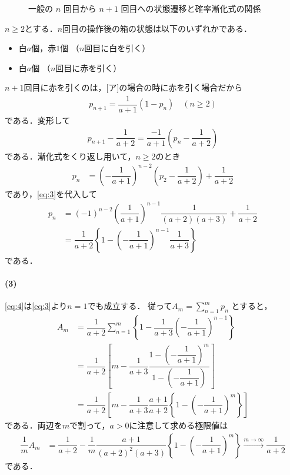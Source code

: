 \documentclass[../../main.tex]{subfiles}
\begin{document}
\begin{figure}[htb]
  \caption{一般の $n$ 回目から $n+1$ 回目への状態遷移と確率漸化式の関係}
  \label{fig:general_step_markov_transition}
\end{figure}

$n \ge 2$とする．$n$回目の操作後の箱の状態は以下のいずれかである．
\begin{itemize}
  \item[ア] 白$a$個，赤$1$個 （$n$回目に白を引く）
  \item[イ] 白$a$個 （$n$回目に赤を引く）
\end{itemize}

$n+1$回目に赤を引くのは，[ア]の場合の時に赤を引く場合だから
\begin{align}
  p_{n+1} = \dfrac{1}{a+1} (1-p_n) \quad (n \ge 2)
\end{align}
である．変形して
\begin{align}
  p_{n+1} - \dfrac{1}{a+2} = \dfrac{-1}{a+1} \left( p_n - \dfrac{1}{a+2} \right)
\end{align}
である．漸化式をくり返し用いて，$n \ge 2$のとき
\begin{align}
  p_n
  &= \left(-\dfrac{1}{a+1}\right)^{n-2} \left( p_2 - \dfrac{1}{a+2} \right) + \dfrac{1}{a+2}
\end{align}
であり，\cref{eq:3}を代入して
\begin{align}
  p_n
  &= (-1)^{n-2} \left( \dfrac{1}{a+1} \right)^{n-1} \dfrac{1}{(a+2)(a+3)} + \dfrac{1}{a+2} \\
  &= \dfrac{1}{a+2} \left\{ 1 - \left(-\dfrac{1}{a+1}\right)^{n-1} \dfrac{1}{a+3} \right\} \label{eq:4}
\end{align}
である．

\paragraph{(3)}

\cref{eq:4}は\cref{eq:3}より$n=1$でも成立する．
従って$A_m = \sum_{n=1}^m p_n$ とすると，
\begin{align}
  A_m
  &= \dfrac{1}{a+2}\sum_{n=1}^m \left\{ 1 - \dfrac{1}{a+3} \left(-\dfrac{1}{a+1}\right)^{n-1} \right\} \\
  &= \dfrac{1}{a+2}\left[m - \dfrac{1}{a+3} \dfrac{1 - \left(-\dfrac{1}{a+1}\right)^m}{1 - \left(-\dfrac{1}{a+1}\right)}\right] \\
  &= \dfrac{1}{a+2}\left[m - \dfrac{1}{a+3} \dfrac{a+1}{a+2} \left\{ 1 - \left(-\dfrac{1}{a+1}\right)^m \right\}\right]
\end{align}
である．両辺を$m$で割って，$a>0$に注意して求める極限値は
\begin{align}
  \dfrac{1}{m} A_m
  & = \dfrac{1}{a+2} - \dfrac{1}{m} \dfrac{a+1}{(a+2)^2(a+3)} \left\{ 1 - \left(-\dfrac{1}{a+1}\right)^m \right\} \xrightarrow{m\to\infty} \dfrac{1}{a+2}
\end{align}
である．
\end{document}

